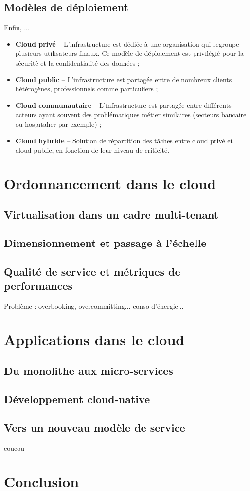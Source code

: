 \subsection{Modèles de déploiement}

Enfin, ...

\begin{itemize}
    \item \textbf{Cloud privé} -- L'infrastructure est dédiée à une organisation qui regroupe plusieurs utilisateurs finaux. Ce modèle de déploiement est privilégié pour la sécurité et la confidentialité des données ;
    \item \textbf{Cloud public} -- L'infrastructure est partagée entre de nombreux clients hétérogènes, professionnels comme particuliers ;
    \item \textbf{Cloud communautaire} -- L'infrastructure est partagée entre différents acteurs ayant souvent des problématiques métier similaires (secteurs bancaire ou hospitalier par exemple) ;
    \item \textbf{Cloud hybride} -- Solution de répartition des tâches entre cloud privé et cloud public, en fonction de leur niveau de criticité.
\end{itemize}

\section{Ordonnancement dans le cloud}

\subsection{Virtualisation dans un cadre multi-tenant}

\subsection{Dimensionnement et passage à l'échelle}

\subsection{Qualité de service et métriques de performances}

Problème : overbooking, overcommitting... conso d'énergie...

\section{Applications dans le cloud}

\subsection{Du monolithe aux micro-services}

\subsection{Développement cloud-native}

\subsection{Vers un nouveau modèle de service}coucou

\section{Conclusion}
